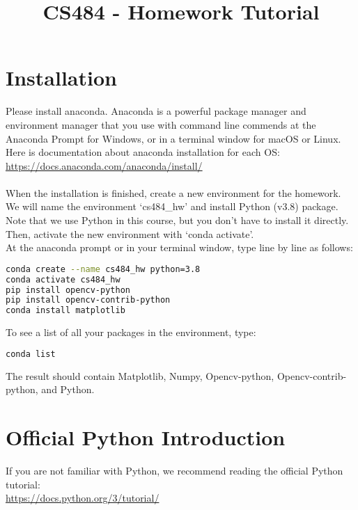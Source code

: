 \documentclass[11pt]{article}
\date{}
\title{CS484 - Homework Tutorial}
\begin{document}
\maketitle
\vspace{-2cm}
\thispagestyle{fancy}

\section{Installation}

Please install anaconda. Anaconda is a powerful package manager and environment manager that you use with command line commends at the Anaconda Prompt for Windows, or in a terminal window for macOS or Linux. Here is documentation about anaconda installation for each OS:\\ \href{https://docs.anaconda.com/anaconda/install/}{https://docs.anaconda.com/anaconda/install/}\\
\\
When the installation is finished, create a new environment for the homework. We will name the environment `cs484\_hw' and install Python (v3.8) package. Note that we use Python in this course, but you don't have to install it directly. Then, activate the new environment with `conda activate'.\\
At the anaconda prompt or in your terminal window, type line by line as follows:

\begin{lstlisting}[language=bash]
conda create --name cs484_hw python=3.8
conda activate cs484_hw
pip install opencv-python
pip install opencv-contrib-python
conda install matplotlib
\end{lstlisting}

To see a list of all your packages in the environment, type:

\begin{lstlisting}[language=bash]
conda list
\end{lstlisting}

The result should contain Matplotlib, Numpy, Opencv-python, Opencv-contrib-python, and Python.

\section{Official Python Introduction}

If you are not familiar with Python, we recommend reading the official Python tutorial:\\
\href{https://docs.python.org/3/tutorial/}{https://docs.python.org/3/tutorial/}
\end{document}
